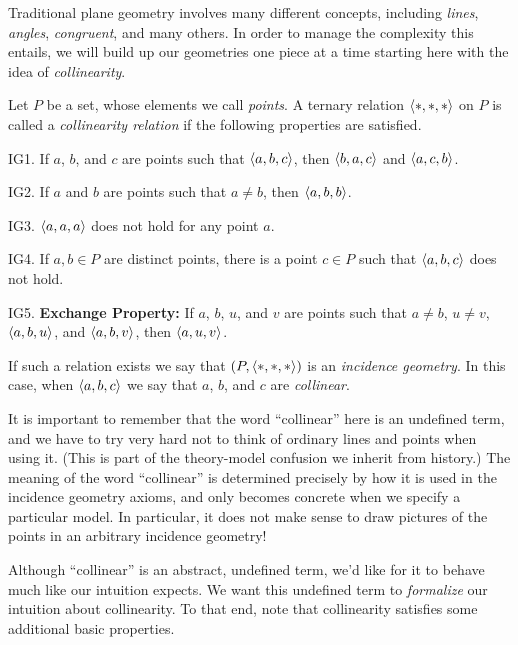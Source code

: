 Traditional plane geometry involves many different concepts, including \emph{lines}, \emph{angles}, \emph{congruent}, and many others.
In order to manage the complexity this entails, we will build up our geometries one piece at a time starting here with the idea of \emph{collinearity}.

\begin{dfn} \label{dfn:incidence-geometry}
Let \(P\) be a set, whose elements we call \emph{points}.
A ternary relation \(\langle \ast, \ast, \ast \rangle\) on \(P\) is called a \emph{collinearity relation} if the following properties are satisfied.
\begin{proplist}
\item[IG1.] If \(a\), \(b\), and \(c\) are points such that \(\langle a, b, c \rangle\), then \(\langle b, a, c \rangle\) and \(\langle a, c, b \rangle\).
\item[IG2.] If \(a\) and \(b\) are points such that \(a \neq b\), then \(\langle a, b, b \rangle\).
\item[IG3.] \(\langle a, a, a \rangle\) does not hold for any point \(a\).
\item[IG4.] If \(a,b \in P\) are distinct points, there is a point \(c \in P\) such that \(\langle a, b, c \rangle\) does not hold.
\item[IG5.] \textbf{Exchange Property:} If \(a\), \(b\), \(u\), and \(v\) are points such that \(a \neq b\), \(u \neq v\), \(\langle a, b, u \rangle\), and \(\langle a, b, v \rangle\), then \(\langle a, u, v \rangle\).
\end{proplist}
If such a relation exists we say that \((P, \langle \ast, \ast, \ast \rangle)\) is an \emph{incidence geometry}.
In this case, when \(\langle a, b, c \rangle\) we say that \(a\), \(b\), and \(c\) are \emph{collinear}.
\end{dfn}

It is important to remember that the word ``collinear'' here is an undefined term, and we have to try very hard not to think of ordinary lines and points when using it.
(This is part of the theory-model confusion we inherit from history.)
The meaning of the word ``collinear'' is determined precisely by how it is used in the incidence geometry axioms, and only becomes concrete when we specify a particular model.
In particular, it does not make sense to draw pictures of the points in an arbitrary incidence geometry!

Although ``collinear'' is an abstract, undefined term, we'd like for it to behave much like our intuition expects.
We want this undefined term to \emph{formalize} our intuition about collinearity.
To that end, note that collinearity satisfies some additional basic properties.

